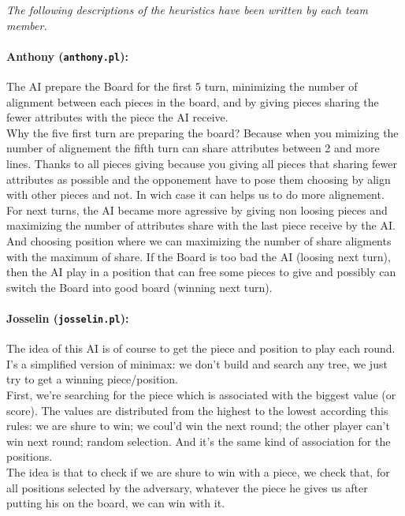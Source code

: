 \documentclass[a4paper,11pt]{article}
\newcommand{\tw}[1]{\texttt{#1}}
\begin{document}
		\textit{The following descriptions of the heuristics have been written by each team member.}
		
		\paragraph{Anthony (\tw{anthony.pl}):} The AI prepare the Board for the first 5 turn, minimizing the number of alignment between each pieces in the board, and by giving pieces sharing the fewer attributes with the piece the AI receive. \\
		Why the five first turn are preparing the board? Because when you mimizing the number of alignement the fifth turn can share attributes between 2 and more lines. Thanks to all pieces giving because you giving all pieces that sharing fewer attributes as possible and the opponement have to pose them choosing by align with other pieces and not. In wich case it can helps us to do more alignement. \\
		For next turns, the AI became more agressive by giving non loosing pieces and maximizing the number of attributes share with the last piece receive by the AI. And choosing position where we can maximizing the number of share aligments with the maximum of share. If the Board is too bad the AI (loosing next turn), then the AI play in a position that can free some pieces to give and possibly can switch the Board into good board (winning next turn).

		\paragraph{Josselin (\tw{josselin.pl}):} The idea of this AI is of course to get the piece and position to play each round. I's a simplified version of minimax: we don't build and search any tree, we just try to get a winning piece/position. \\
		First, we're searching for the piece which is associated with the biggest value (or score). The values are distributed from the highest to the lowest according this rules: we are shure to win; we coul'd win the next round; the other player can't win next round; random selection. And it's the same kind of association for the positions. \\
		The idea is that to check if we are shure to win with a piece, we check that, for all positions selected by the adversary, whatever the piece he gives us after putting his on the board, we can win with it.
\end{document}
